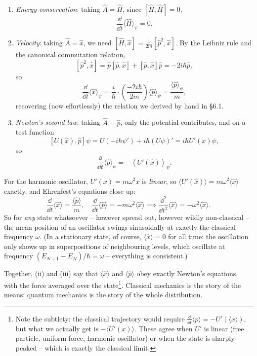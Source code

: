 \begin{enumerate}[label=(\roman*)]
    \item \emph{Energy conservation}: taking $\hat{A} = \hat{H}$, since $[\hat H, \hat H] = 0$,
    $$
    \frac{\dd}{\dd t}\langle \hat{H} \rangle_\psi = 0.
    $$
    \item \emph{Velocity}: taking $\hat{A} = \hat{x}$, we need $[\hat{H}, \hat{x}] = \frac{1}{2m}[\hat{p}^2, \hat{x}]$. By the Leibniz rule and the canonical commutation relation,
    $$
    [\hat p^2, \hat x] = \hat p [\hat p, \hat x] + [\hat p, \hat x]\hat p = -2i\hbar \hat p,
    $$
    so
    $$
    \frac{\dd}{\dd t} \langle \hat{x} \rangle_\psi = \frac{i}{\hbar} \cdot \left(\frac{-2 i \hbar}{2m}\right) \langle \hat{p}\rangle_\psi = \frac{\langle \hat{p} \rangle_\psi}{m},
    $$
    recovering (now effortlessly) the relation we derived by hand in \S 6.1.
    \item \emph{Newton's second law}: taking $\hat{A} = \hat{p}$, only the potential contributes, and on a test function
    $$
    [U(\hat x), \hat{p}]\psi = U \left(-i\hbar \psi'\right) + i\hbar (U\psi)' = i \hbar U'(x) \psi,
    $$
    so
    $$
    \frac{\dd}{\dd t} \langle \hat{p} \rangle_\psi = -\left\langle U'(\hat x) \right\rangle_\psi.
    $$
\end{enumerate}
\begin{example}
    For the harmonic oscillator, $U'(x) = m\omega^2 x$ is \emph{linear}, so $\langle U'(\hat x) \rangle = m \omega^2 \langle \hat{x} \rangle$ exactly, and Ehrenfest's equations close up:
    $$
    \frac{\dd}{\dd t}\langle \hat x \rangle = \frac{\langle \hat p \rangle}{m}, \quad \frac{\dd}{\dd t} \langle \hat{p} \rangle = -m\omega^2 \langle \hat{x} \rangle
    \implies \frac{\dd^2}{\dd t^2}\langle \hat{x} \rangle = -\omega^2 \langle \hat{x} \rangle.
    $$
    So for \emph{any} state whatsoever -- however spread out, however wildly non-classical -- the mean position of an oscillator swings sinusoidally at exactly the classical frequency $\omega$. (In a stationary state, of course, $\langle \hat x \rangle = 0$ for all time: the oscillation only shows up in superpositions of neighbouring levels, which oscillate at frequency $(E_{N+1} - E_N)/\hbar = \omega$ -- everything is consistent.)
\end{example}

Together, (ii) and (iii) say that $\langle \hat x \rangle$ and $\langle \hat p \rangle$ obey exactly Newton's equations, with the force averaged over the state\footnote{Note the subtlety: the classical trajectory would require $\frac{\dd}{\dd t}\langle p \rangle = -U'(\langle x \rangle)$, but what we actually get is $-\langle U'(x) \rangle$. These agree when $U'$ is linear (free particle, uniform force, harmonic oscillator) or when the state is sharply peaked -- which is exactly the classical limit.}. Classical mechanics is the story of the means; quantum mechanics is the story of the whole distribution.

